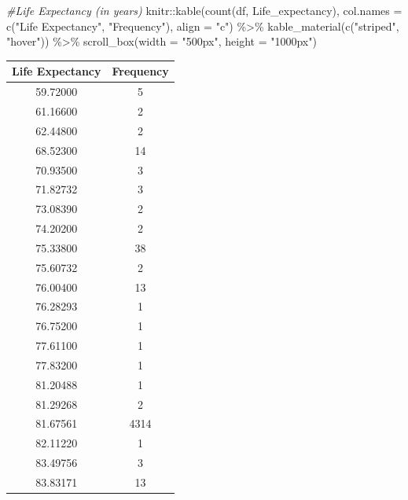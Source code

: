 \documentclass[
]{article}
\newenvironment{Shaded}{\begin{snugshade}}{\end{snugshade}}
\newcommand{\AttributeTok}[1]{\textcolor[rgb]{0.77,0.63,0.00}{#1}}
\newcommand{\CommentTok}[1]{\textcolor[rgb]{0.56,0.35,0.01}{\textit{#1}}}
\newcommand{\FunctionTok}[1]{\textcolor[rgb]{0.00,0.00,0.00}{#1}}
\newcommand{\NormalTok}[1]{#1}
\newcommand{\SpecialCharTok}[1]{\textcolor[rgb]{0.00,0.00,0.00}{#1}}
\newcommand{\StringTok}[1]{\textcolor[rgb]{0.31,0.60,0.02}{#1}}
\begin{document}
\begin{Shaded}
\begin{Highlighting}[]
\CommentTok{\#Life Expectancy (in years)}
\NormalTok{knitr}\SpecialCharTok{::}\FunctionTok{kable}\NormalTok{(}\FunctionTok{count}\NormalTok{(df, }\StringTok{\textquotesingle{}Life\_expectancy\textquotesingle{}}\NormalTok{), }\AttributeTok{col.names =} \FunctionTok{c}\NormalTok{(}\StringTok{"Life Expectancy"}\NormalTok{, }\StringTok{"Frequency"}\NormalTok{), }\AttributeTok{align =} \StringTok{"c"}\NormalTok{) }\SpecialCharTok{\%\textgreater{}\%}
  \FunctionTok{kable\_material}\NormalTok{(}\FunctionTok{c}\NormalTok{(}\StringTok{"striped"}\NormalTok{, }\StringTok{"hover"}\NormalTok{)) }\SpecialCharTok{\%\textgreater{}\%} 
 \FunctionTok{scroll\_box}\NormalTok{(}\AttributeTok{width =} \StringTok{"500px"}\NormalTok{, }\AttributeTok{height =} \StringTok{"1000px"}\NormalTok{)}
\end{Highlighting}
\end{Shaded}

\begin{table}
\centering
\begin{tabular}{c|c}
\hline
Life Expectancy & Frequency\\
\hline
59.72000 & 5\\
\hline
61.16600 & 2\\
\hline
62.44800 & 2\\
\hline
68.52300 & 14\\
\hline
70.93500 & 3\\
\hline
71.82732 & 3\\
\hline
73.08390 & 2\\
\hline
74.20200 & 2\\
\hline
75.33800 & 38\\
\hline
75.60732 & 2\\
\hline
76.00400 & 13\\
\hline
76.28293 & 1\\
\hline
76.75200 & 1\\
\hline
77.61100 & 1\\
\hline
77.83200 & 1\\
\hline
81.20488 & 1\\
\hline
81.29268 & 2\\
\hline
81.67561 & 4314\\
\hline
82.11220 & 1\\
\hline
83.49756 & 3\\
\hline
83.83171 & 13\\
\hline
\end{tabular}
\end{table}
\end{document}
